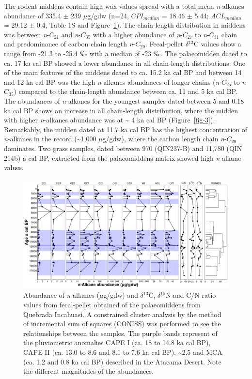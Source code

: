 \documentclass[
  authoryear,
  preprint,
  3p]{elsarticle}
\begin{document}
The rodent middens contain high wax values spread with a total mean
\emph{n}-alkanes abundance of 335.4 \(\pm\) 239 \(\mu\)g/gdw (n=24,
\(CPI_{median}\) = 18.46 \(\pm\) 5.44; \(ACL_{median}\) = 29.12 \(\pm\)
0.4, Table 1S and Figure~\ref{fig-4}). The chain-length distribution in
middens was between \emph{n}-\(C_{21}\) and \emph{n}-\(C_{35}\) with a
higher abundance of \emph{n}-\(C_{27}\) to \emph{n}-\(C_{31}\) chain and
predominance of carbon chain length \emph{n}-\(C_{29}\). Fecal-pellet
\(\delta\)\(^{13}\)C values show a range from -21.3 to -25.4
\(\text{\textperthousand}\) with a median of -23
\(\text{\textperthousand}\). The palaeomidden dated to ca. 17 ka cal BP
showed a lower abundance in all chain-length distributions. One of the
main features of the middens dated to ca. 15.2 ka cal BP and between 14
and 12 ka cal BP was the high \emph{n}-alkanes abundances of longer
chains (\emph{n}-\(C_{25}\) to \emph{n}-\(C_{35}\)) compared to the
chain-length abundance between ca. 11 and 5 ka cal BP. The abundances of
\emph{n}-alkanes for the youngest samples dated between 5 and 0.18 ka
cal BP shows an increase in all chain-length distribution, where the
midden with higher \emph{n}-alkanes abundance was at \textasciitilde{} 4
ka cal BP (Figure~\ref{fig-3}). Remarkably, the midden dated at 11.7 ka
cal BP has the highest concentration of \emph{n}-alkanes in the record
(\textasciitilde1,000 \(\mu\)g/gdw), where the carbon length chain
\emph{n}-\(C_{29}\) dominates. Two grass samples, dated between 970
(QIN237-B) and 11,780 (QIN 214b) a cal BP, extracted from the
palaeomiddens matrix showed high \emph{n}-alkane values.

\begin{figure}

{\centering \includegraphics{Fig_4.png}

}

\caption{\label{fig-4}Abundance of \emph{n}-alkanes (\(\mu\)g/gdw) and
\(\delta\)\(^{13}\)C, \(\delta\)\(^{15}\)N and C/N ratio values from
fecal-pellet obtained of the palaeomiddens from Quebrada Incahuasi. A
constrained cluster analysis by the method of incremental sum of squares
(CONISS) was performed to see the relationships between the samples. The
purple bands represent of the pluviometric anomalies CAPE I (ca. 18 to
14.8 ka cal BP), CAPE II (ca. 13.0 to 8.6 and 8.1 to 7.6 ka cal BP),
\textasciitilde2.5 and MCA (ca. 1.2 and 0.8 ka cal BP) described in the
Atacama Desert. Note the different magnitudes of the abundances.}

\end{figure}
\end{document}
